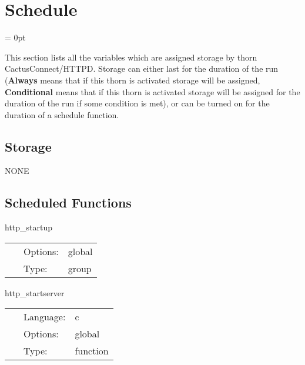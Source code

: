 
\section{Schedule} 


\parskip = 0pt


\noindent This section lists all the variables which are assigned storage by thorn CactusConnect/HTTPD.  Storage can either last for the duration of the run ({\bf Always} means that if this thorn is activated storage will be assigned, {\bf Conditional} means that if this thorn is activated storage will be assigned for the duration of the run if some condition is met), or can be turned on for the duration of a schedule function.


\subsection*{Storage}NONE
\subsection*{Scheduled Functions}
\vspace{5mm}


\hspace{5mm} http\_startup 

\hspace{5mm}{\it http daemon startup group } 


\hspace{5mm}

 \begin{tabular*}{160mm}{cll} 
~ & Options:  & global \\ 
~ & Type:  & group \\ 
\end{tabular*} 


\vspace{5mm}


\hspace{5mm} http\_startserver 

\hspace{5mm}{\it start http server } 


\hspace{5mm}

 \begin{tabular*}{160mm}{cll} 
~ & Language:  & c \\ 
~ & Options:  & global \\ 
~ & Type:  & function \\ 
\end{tabular*} 


